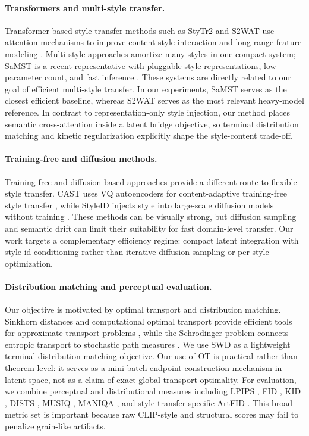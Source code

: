 ﻿\documentclass[letterpaper]{article}
\begin{document}
\paragraph{Transformers and multi-style transfer.}
Transformer-based style transfer methods such as StyTr2 and S2WAT use attention mechanisms to improve content-style interaction and long-range feature modeling \cite{deng2022stytr2,xia2024s2wat}. Multi-style approaches amortize many styles in one compact system; SaMST is a recent representative with pluggable style representations, low parameter count, and fast inference \cite{liu2024samst}. These systems are directly related to our goal of efficient multi-style transfer. In our experiments, SaMST serves as the closest efficient baseline, whereas S2WAT serves as the most relevant heavy-model reference. In contrast to representation-only style injection, our method places semantic cross-attention inside a latent bridge objective, so terminal distribution matching and kinetic regularization explicitly shape the style-content trade-off.

\paragraph{Training-free and diffusion methods.}
Training-free and diffusion-based approaches provide a different route to flexible style transfer. CAST uses VQ autoencoders for content-adaptive training-free style transfer \cite{gim2024cast}, while StyleID injects style into large-scale diffusion models without training \cite{chung2024styleid}. These methods can be visually strong, but diffusion sampling and semantic drift can limit their suitability for fast domain-level transfer. Our work targets a complementary efficiency regime: compact latent integration with style-id conditioning rather than iterative diffusion sampling or per-style optimization.

\paragraph{Distribution matching and perceptual evaluation.}
Our objective is motivated by optimal transport and distribution matching. Sinkhorn distances and computational optimal transport provide efficient tools for approximate transport problems \cite{cuturi2013sinkhorn,peyre2019computational}, while the Schrodinger problem connects entropic transport to stochastic path measures \cite{leonard2014survey}. We use SWD as a lightweight terminal distribution matching objective. Our use of OT is practical rather than theorem-level: it serves as a mini-batch endpoint-construction mechanism in latent space, not as a claim of exact global transport optimality. For evaluation, we combine perceptual and distributional measures including LPIPS \cite{zhang2018lpips}, FID \cite{heusel2017fid}, KID \cite{binkowski2018kid}, DISTS \cite{ding2020dists}, MUSIQ \cite{ke2021musiq}, MANIQA \cite{yang2022maniqa}, and style-transfer-specific ArtFID \cite{wright2022artfid}. This broad metric set is important because raw CLIP-style and structural scores may fail to penalize grain-like artifacts.
\end{document}
